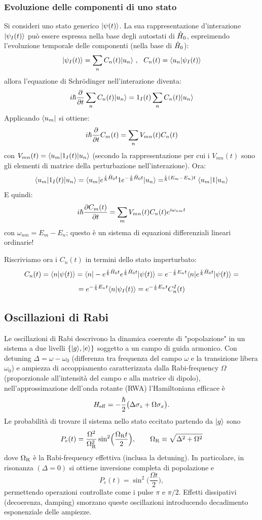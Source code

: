 \subsubsection*{Evoluzione delle componenti di uno stato}
Si consideri uno stato generico $\Ket{\psi(t)}$. La sua rappresentazione d'interazione $\Ket{\psi_I(t)}$ può essere espressa nella base degli autostati di $\H_0$, espreimendo l'evoluzione temporale delle componenti (nella base di $\H_0$):
\[
    \Ket{\psi_I(t)} = \sum_n C_n(t) \Ket{u_n}\ ,\ \ C_n(t) = \braket{u_n}{\psi_I(t)}
\]
allora l'equazione di Schrödinger nell'interazione diventa:
\[
    i \hslash \tderiv{} \sum_n C_n(t) \Ket{u_n} = \V_I(t) \sum_n C_n(t) \Ket{u_n}
\]
Applicando $\Bra{u_m}$ si ottiene:
\[
    i \hslash \tderiv{} C_m(t) = \sum_n V_{mn}(t) C_n(t)
\]
con $V_{mn}(t) = \Bra{u_m} \V_I(t) \Ket {u_n}$ (secondo la rappresentazione per cui i $V_{mn}(t)$ sono gli elementi di matrice della perturbazione nell'interazione). Ora:
\[
    \Bra{u_m} \V_I(t) \Ket {u_n} = \Bra{u_m} e^{\frac{i}{\hslash} \H_0 t} \V e^{-\frac{i}{\hslash} \H_0 t} \Ket {u_n} =  ^{\frac{i}{\hslash} (E_m - E_n) t}\Bra{u_m} \V \Ket {u_n}
\]
E quindi:
\[
    i\hslash \tderiv {C_m(t)} = \sum_m V_{mn}(t) C_n(t) e^{i \omega_{nm} t}
\]
con $\omega_{nm} = E_m-E_n$; questo è un sistema di equazioni differenziali lineari ordinarie!


Riscriviamo ora i $C_n(t)$ in termini dello stato imperturbato:
\[
    C_n(t) = \braket{n}{\psi(t)} = \braketin{n}{-e^{\frac{i}{\hslash}\H_0 t}e^{\frac{i}{\hslash} \H_0 t}}{\psi(t)} = e^{-\frac{i}{\hslash} E_n t} \braketin{n}{e^{\frac{i}{\hslash} \H_0 t}}{\psi(t)} =\]\[
    = e^{-\frac{i}{\hslash} E_n t} \braket{n}{\psi_I(t)} = e^{-\frac{i}{\hslash} E_n t} C_n^I(t)
\]

\subsection{Oscillazioni di Rabi}
Le oscillazioni di Rabi descrivono la dinamica coerente di "popolazione" in un sistema a due livelli \(\{\Ket{g},\Ket{e}\}\) soggetto a un campo di guida armonico. Con detuning \(\Delta=\omega-\omega_0\) (differenza tra frequenza del campo \(\omega\) e la transizione libera \(\omega_0\)) e ampiezza di accoppiamento caratterizzata dalla Rabi-frequency \(\Omega\) (proporzionale all'intensità del campo e alla matrice di dipolo), nell'approssimazione dell'onda rotante (RWA) l'Hamiltoniana efficace è
\[
    H_{\rm eff} = -\frac{\hbar}{2}\big(\Delta\sigma_z + \Omega\sigma_x\big).
\]
Le probabilità di trovare il sistema nello stato eccitato partendo da \(\Ket{g}\) sono
\[
    P_e(t)=\frac{\Omega^2}{\Omega_{\rm R}^2}\sin^2\!\Big(\frac{\Omega_{\rm R} t}{2}\Big),
    \qquad
    \Omega_{\rm R}\equiv\sqrt{\Delta^2+\Omega^2}
\]
dove \(\Omega_{\rm R}\) è la Rabi-frequency effettiva (inclusa la detuning). In particolare, in risonanza \((\Delta=0)\) si ottiene inversione completa di popolazione e
\[
    P_e(t)=\sin^2\!\Big(\frac{\Omega t}{2}\Big),
\]
permettendo operazioni controllate come i pulse \(\pi\) e \(\pi/2\). Effetti dissipativi (decoerenza, damping) smorzano queste oscillazioni introducendo decadimento esponenziale delle ampiezze.

